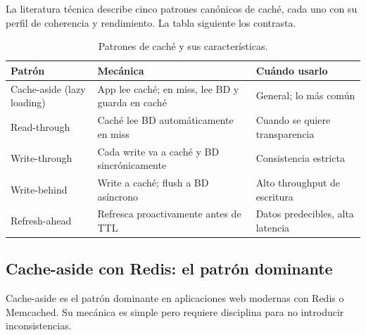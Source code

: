\documentclass[11pt,a4paper,openany]{book}
\begin{document}
La literatura técnica describe cinco patrones canónicos de
caché, cada uno con su perfil de coherencia y rendimiento. La tabla
siguiente los contrasta.


\begin{table}[htbp]
\centering
\caption{Patrones de caché y sus características.}
\footnotesize
\begin{tabularx}{\textwidth}{lXX}
\toprule
\textbf{Patrón} & \textbf{Mecánica} & \textbf{Cuándo usarlo}\\
\midrule
Cache-aside (lazy loading) & App lee caché; en miss, lee BD y guarda en caché & General; lo más común\\
Read-through & Caché lee BD automáticamente en miss & Cuando se quiere transparencia\\
Write-through & Cada write va a caché y BD sincrónicamente & Consistencia estricta\\
Write-behind & Write a caché; flush a BD asíncrono & Alto throughput de escritura\\
Refresh-ahead & Refresca proactivamente antes de TTL & Datos predecibles, alta latencia\\
\bottomrule
\end{tabularx}
\end{table}

\subsection{Cache-aside con Redis: el patrón dominante}

Cache-aside es el patrón dominante en aplicaciones web
modernas con Redis o Memcached. Su mecánica es simple pero requiere
disciplina para no introducir inconsistencias.
\end{document}
